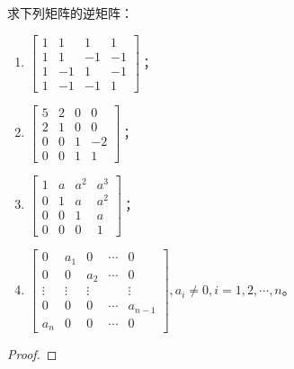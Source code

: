 \begin{problem}
求下列矩阵的逆矩阵：
\begin{enumerate}
    \item \(\begin{bmatrix}
              1 & 1  & 1  & 1  \\
              1 & 1  & -1 & -1 \\
              1 & -1 & 1  & -1 \\
              1 & -1 & -1 & 1
          \end{bmatrix}\)；
    \item \(\begin{bmatrix}
              5 & 2 & 0 & 0  \\
              2 & 1 & 0 & 0  \\
              0 & 0 & 1 & -2 \\
              0 & 0 & 1 & 1
          \end{bmatrix}\)；
    \item \(\begin{bmatrix}
              1 & a & a^2 & a^3 \\
              0 & 1 & a   & a^2 \\
              0 & 0 & 1   & a   \\
              0 & 0 & 0   & 1
          \end{bmatrix}\)；
    \item \(\begin{bmatrix}
              0      & a_1    & 0      & \cdots & 0       \\
              0      & 0      & a_2    & \cdots & 0       \\
              \vdots & \vdots & \vdots &        & \vdots  \\
              0      & 0      & 0      & \cdots & a_{n-1} \\
              a_n    & 0      & 0      & \cdots & 0
          \end{bmatrix},a_i\neq0,i=1,2,\cdots,n\)。
\end{enumerate}
\end{problem}
\begin{proof}

\end{proof}

